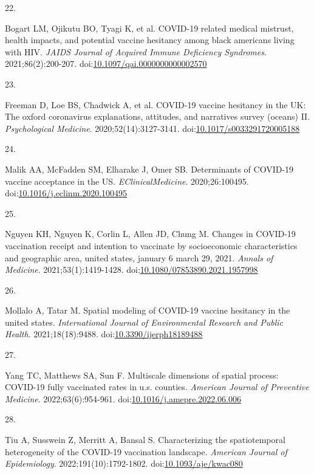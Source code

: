 \documentclass[
]{article}
\newlength{\cslhangindent}
\newlength{\csllabelwidth}
\newlength{\cslentryspacingunit} %
\newenvironment{CSLReferences}[2] %
 {%
  \setlength{\parindent}{0pt}
  \ifodd #1
  \let\oldpar\par
  \def\par{\hangindent=\cslhangindent\oldpar}
  \fi
  \setlength{\parskip}{#2\cslentryspacingunit}
 }%
 {}
\newcommand{\CSLLeftMargin}[1]{\parbox[t]{\csllabelwidth}{#1}}
\newcommand{\CSLRightInline}[1]{\parbox[t]{\linewidth - \csllabelwidth}{#1}\break}
\begin{document}
\begin{CSLReferences}{0}{0}
\leavevmode{}%
\CSLLeftMargin{22. }%
\CSLRightInline{Bogart LM, Ojikutu BO, Tyagi K, et al. {COVID}-19
related medical mistrust, health impacts, and potential vaccine
hesitancy among black americans living with {HIV}. \emph{{JAIDS} Journal
of Acquired Immune Deficiency Syndromes}. 2021;86(2):200-207.
doi:\href{https://doi.org/10.1097/qai.0000000000002570}{10.1097/qai.0000000000002570}}

\leavevmode{}%
\CSLLeftMargin{23. }%
\CSLRightInline{Freeman D, Loe BS, Chadwick A, et al. {COVID}-19 vaccine
hesitancy in the {UK}: The oxford coronavirus explanations, attitudes,
and narratives survey (oceans) {II}. \emph{Psychological Medicine}.
2020;52(14):3127-3141.
doi:\href{https://doi.org/10.1017/s0033291720005188}{10.1017/s0033291720005188}}

\leavevmode{}%
\CSLLeftMargin{24. }%
\CSLRightInline{Malik AA, McFadden SM, Elharake J, Omer SB. Determinants
of {COVID}-19 vaccine acceptance in the {US}.
\emph{{EClinicalMedicine}}. 2020;26:100495.
doi:\href{https://doi.org/10.1016/j.eclinm.2020.100495}{10.1016/j.eclinm.2020.100495}}

\leavevmode{}%
\CSLLeftMargin{25. }%
\CSLRightInline{Nguyen KH, Nguyen K, Corlin L, Allen JD, Chung M.
Changes in {COVID}-19 vaccination receipt and intention to vaccinate by
socioeconomic characteristics and geographic area, united states,
january 6 {\textendash} march 29, 2021. \emph{Annals of Medicine}.
2021;53(1):1419-1428.
doi:\href{https://doi.org/10.1080/07853890.2021.1957998}{10.1080/07853890.2021.1957998}}

\leavevmode{}%
\CSLLeftMargin{26. }%
\CSLRightInline{Mollalo A, Tatar M. Spatial modeling of {COVID}-19
vaccine hesitancy in the united states. \emph{International Journal of
Environmental Research and Public Health}. 2021;18(18):9488.
doi:\href{https://doi.org/10.3390/ijerph18189488}{10.3390/ijerph18189488}}

\leavevmode{}%
\CSLLeftMargin{27. }%
\CSLRightInline{Yang TC, Matthews SA, Sun F. Multiscale dimensions of
spatial process: {COVID}-19 fully vaccinated rates in u.s. counties.
\emph{American Journal of Preventive Medicine}. 2022;63(6):954-961.
doi:\href{https://doi.org/10.1016/j.amepre.2022.06.006}{10.1016/j.amepre.2022.06.006}}

\leavevmode{}%
\CSLLeftMargin{28. }%
\CSLRightInline{Tiu A, Susswein Z, Merritt A, Bansal S. Characterizing
the spatiotemporal heterogeneity of the {COVID}-19 vaccination
landscape. \emph{American Journal of Epidemiology}.
2022;191(10):1792-1802.
doi:\href{https://doi.org/10.1093/aje/kwac080}{10.1093/aje/kwac080}}


\end{CSLReferences}
\end{document}
